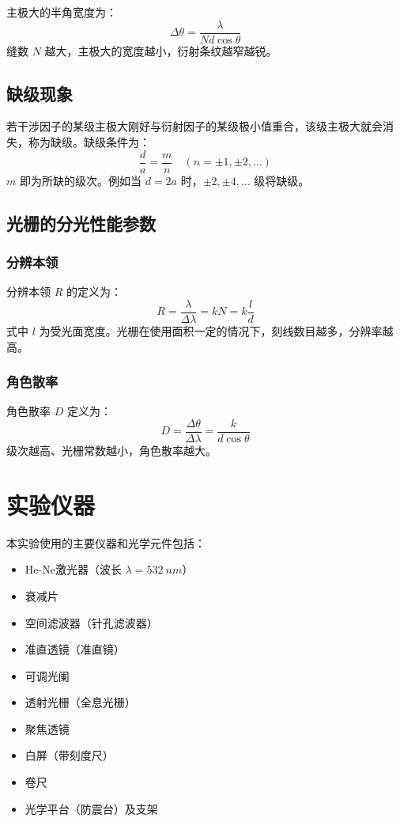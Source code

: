 \documentclass[12pt, a4paper]{article}
\begin{document}
主极大的半角宽度为：
\begin{equation}
\Delta\theta = \frac{\lambda}{Nd\cos\theta}
\label{eq:half-width}
\end{equation}
缝数 $N$ 越大，主极大的宽度越小，衍射条纹越窄越锐。

\subsection{缺级现象}

若干涉因子的某级主极大刚好与衍射因子的某级极小值重合，该级主极大就会消失，称为缺级。缺级条件为：
\begin{equation}
\frac{d}{a} = \frac{m}{n} \quad (n = \pm 1, \pm 2, \dots)
\label{eq:missing}
\end{equation}
$m$ 即为所缺的级次。例如当 $d = 2a$ 时，$\pm 2, \pm 4, \dots$ 级将缺级。

\subsection{光栅的分光性能参数}

\subsubsection{分辨本领}

分辨本领 $R$ 的定义为：
\begin{equation}
R = \frac{\lambda}{\Delta\lambda} = kN = k\frac{l}{d}
\label{eq:resolution}
\end{equation}
式中 $l$ 为受光面宽度。光栅在使用面积一定的情况下，刻线数目越多，分辨率越高。

\subsubsection{角色散率}

角色散率 $D$ 定义为：
\begin{equation}
D = \frac{\Delta\theta}{\Delta\lambda} = \frac{k}{d\cos\theta}
\label{eq:dispersion}
\end{equation}
级次越高、光栅常数越小，角色散率越大。

\section{实验仪器}

本实验使用的主要仪器和光学元件包括：
\begin{itemize}
  \item He-Ne激光器（波长 $\lambda = \SI{532}{nm}$）
  \item 衰减片
  \item 空间滤波器（针孔滤波器）
  \item 准直透镜（准直镜）
  \item 可调光阑
  \item 透射光栅（全息光栅）
  \item 聚焦透镜
  \item 白屏（带刻度尺）
  \item 卷尺
  \item 光学平台（防震台）及支架
\end{itemize}
\end{document}
